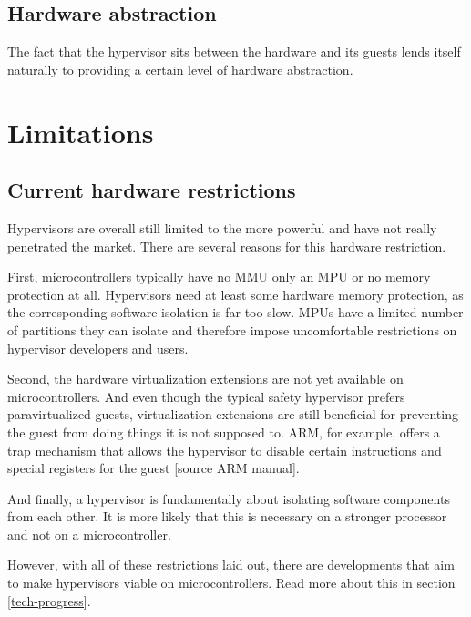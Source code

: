 \subsection{Hardware abstraction}
The fact that the hypervisor sits between the hardware and its guests lends itself naturally to providing a certain level of hardware abstraction. 


\section{Limitations}

\subsection{Current hardware restrictions}
Hypervisors are overall still limited to the more powerful  and have not really penetrated the  market. There are several reasons for this hardware restriction. 

First, microcontrollers typically have no \gls{MMU} only an \gls{MPU} or no memory protection at all. Hypervisors need at least some hardware memory protection, as the corresponding software isolation is far too slow. \gls{MPU}s have a limited number of partitions they can isolate and therefore impose uncomfortable restrictions on hypervisor developers and users.

Second, the hardware virtualization extensions are not yet available on microcontrollers. And even though the typical safety hypervisor prefers paravirtualized guests, virtualization extensions are still beneficial for preventing the guest from doing things it is not supposed to. ARM, for example, offers a trap mechanism that allows the hypervisor to disable certain instructions and special registers for the guest [source ARM manual]. 

And finally, a hypervisor is fundamentally about isolating software components from each other. It is more likely that this is necessary on a stronger processor and not on a microcontroller.

However, with all of these restrictions laid out, there are developments that aim to make hypervisors viable on microcontrollers. Read more about this in section \ref{tech-progress}.

